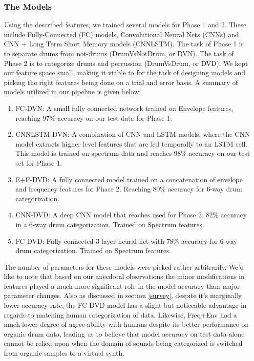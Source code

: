 \documentclass{nime-alternate} %
\begin{document}
\subsubsection{The Models}
Using the described features, we trained several models for Phase 1 and 2. These include Fully-Connected (FC) models, Convolutional Neural Nets (CNNs) and CNN + Long Term Short Memory models (CNNLSTM). The task of Phase 1 is to separate drums from not-drums (DrumVsNotDrum, or DVN). The task of Phase 2 is to categorize drums and percussion (DrumVsDrum, or DVD). We kept our feature space small, making it viable to for the task of designing models and picking the right features being done on a trial and error basis. A summary of models utilized in our pipeline is given below:
\begin {enumerate}
\item FC-DVN: A small fully connected network trained on Envelope features, reaching 97\% accuracy on our test data for Phase 1. 
\item CNNLSTM-DVN: A combination of CNN and LSTM models, where the CNN model extracts higher level features that are fed temporally to an LSTM cell. This model is trained on spectrum data and reaches 98\% accuracy on our test set for Phase 1.
\item E+F-DVD: A fully connected model trained on a concatenation of envelope and frequency features for Phase 2. Reaching 80\% accuracy for 6-way drum categorization.
\item CNN-DVD: A deep CNN model that reaches used for Phase 2. 82\% accuracy in a 6-way drum categorization. Trained on Spectrum features.
\item FC-DVD: Fully connected 3 layer neural net with 78\% accuracy for 6-way drum categorization. Trained on Spectrum features.
\end{enumerate}
The number of parameters for these models were picked rather arbitrarily. We'd like to note that based on our anecdotal observations the minor modifications in features played a much more significant role in the model accuracy than major parameter changes. Also as discussed in section \ref{survey}, despite it's marginally lower accuracy rate, the FC-DVD model has a slight but noticeable advantage in regards to matching human categorization of data. Likewise, Freq+Env had a much lower degree of agree-ability with humans despite its better performance on organic drum data, leading us to believe that model accuracy on test data alone cannot be relied upon when the domain of sounds being categorized is switched from organic samples to a virtual synth. \\
\end{document}
